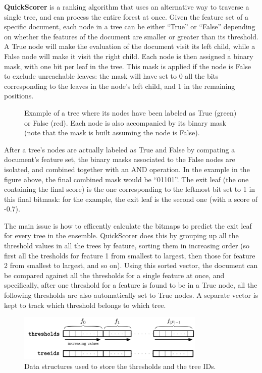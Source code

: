\textbf{QuickScorer} is a ranking algorithm that uses an alternative way to traverse a single tree, and can process the entire forest at once. Given the feature set of a specific document, each node in a tree can be either ``True'' or ``False'' depending on whether the features of the document are smaller or greater than its threshold. A True node will make the evaluation of the document visit its left child, while a False node will make it visit the right child. Each node is then assigned a binary mask, with one bit per leaf in the tree. This mask is applied if the node is False to exclude unreachable leaves: the mask will have set to 0 all the bits corresponding to the leaves in the node's left child, and 1 in the remaining positions.
\begin{figure}[H]
    \centering
    
    \caption{Example of a tree where its nodes have been labeled as True (green) or False (red). Each node is also accompanied by its binary mask (note that the mask is built assuming the node is False).}
\end{figure}
After a tree's nodes are actually labeled as True and False by compating a document's feature set, the binary masks associated to the False nodes are isolated, and combined together with an AND operation. In the example in the figure above, the final combined mask would be ``01101''. The exit leaf (the one containing the final score) is the one corresponding to the leftmost bit set to 1 in this final bitmask: for the example, the exit leaf is the second one (with a score of -0.7).

The main issue is how to efficently calculate the bitmaps to predict the exit leaf for every tree in the ensemble. QuickScorer does this by grouping up all the threshold values in all the trees by feature, sorting them in increasing order (so first all the tresholds for feature 1 from smallest to largest, then those for feature 2 from smallest to largest, and so on). Using this sorted vector, the document can be compared against all the thresholds for a single feature at once, and specifically, after one threshold for a feature is found to be in a True node, all the following thresholds are also automatically set to True nodes. A separate vector is kept to track which threshold belongs to which tree.

\begin{figure}[H]
    \centering
    \includegraphics[width=0.8\textwidth]{img/QuickScorer2.png}
    \caption{Data structures used to store the thresholds and the tree IDs.}
\end{figure}